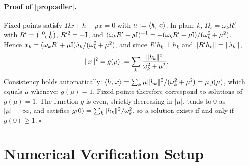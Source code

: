 \paragraph{Proof of \cref{prop:adler}.}
Fixed points satisfy $\Omega x+h-\mu x=0$ with $\mu:=\langle h,\, x\rangle$. In plane $k$, $\Omega_k=\omega_kR'$
with $R'=\begin{psmallmatrix}0&1\\-1&0\end{psmallmatrix}$, $R'^2=-\mathrm{I}$, and
$(\omega_kR'-\mu\mathrm{I})^{-1}=-(\omega_kR'+\mu\mathrm{I})/(\omega_k^2+\mu^2)$. Hence
$x_k=(\omega_kR'+\mu\mathrm{I})h_k/(\omega_k^2+\mu^2)$, and since $R'h_k\perp h_k$ and $\lVert R'h_k\rVert=\lVert h_k\rVert$,
\begin{equation}
  \lVert x\rVert^2=g(\mu):=\sum_k\frac{\lVert h_k\rVert^2}{\omega_k^2+\mu^2}.
\end{equation}
Consistency holds automatically: $\langle h,\, x\rangle=\sum_k\mu\lVert h_k\rVert^2/(\omega_k^2+\mu^2)=\mu\,g(\mu)$, which
equals $\mu$ whenever $g(\mu)=1$. Fixed points therefore correspond to solutions of $g(\mu)=1$. The
function $g$ is even, strictly decreasing in $|\mu|$, tends to $0$ as $|\mu|\to\infty$, and satisfies
$g(0)=\sum_k\lVert h_k\rVert^2/\omega_k^2$, so a solution exists if and only if $g(0)\ge1$. \hfill$\square$

\section{Numerical Verification Setup}
\label{app:numerics}

